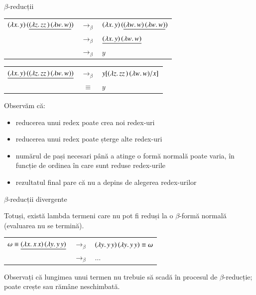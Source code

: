 \documentclass[xcolor=pdftex,romanian,colorlinks]{beamer}
\begin{document}
\begin{frame}[fragile]{$\beta$-reducții}

\begin{center}
\begin{tabular}{rcl}
$(\lambda x.\,y)\, (\underline{(\lambda z.\,zz\, )\, (\lambda w.\,w)})$ & $\rightarrow_\beta$ &  $(\lambda x.\,y)\, (\underline{(\lambda w.\,w)\, (\lambda w.\,w)})$ \\
& $\rightarrow_\beta$ & $\underline{(\lambda x.\,y)\, (\lambda w.\,w)}$ \\
& $\rightarrow_\beta$ & $y$ \\
\end{tabular}
\end{center}

\begin{center}
\begin{tabular}{rcl}
$\underline{(\lambda x.\,y)\, ((\lambda z.\,zz\, )\, (\lambda w.\,w))}$ & $\rightarrow_\beta$ & $y[(\lambda z.\,zz\, )\, (\lambda w.\,w)/x]$ \\ 
& $\equiv$ & $y$ \\
\end{tabular}
\end{center}

Observăm că:
\begin{itemize}
	\item reducerea unui redex poate crea noi redex-uri
	\item reducerea unui redex poate șterge alte redex-uri
	\item numărul de pași necesari până a atinge o formă normală poate varia, în funcție de ordinea în care sunt reduse redex-urile
	\item rezultatul final pare că nu a depins de alegerea redex-urilor 
\end{itemize}

\end{frame}


\begin{frame}[fragile]{$\beta$-reducții divergente}

Totuși, există lambda termeni care nu pot fi reduși la o $\beta$-formă normală (evaluarea nu se termină).

\begin{center}
\begin{tabular}{rcl}
$\omega \equiv \underline{(\lambda x.\,x\, x)\, (\lambda y.\,y\, y)}$ & $\rightarrow_\beta$ & $(\lambda y.\,y\, y)\, (\lambda y.\,y\, y) \equiv \omega$ \\
& $\rightarrow_\beta$ & $\ldots$ \\
\end{tabular}
\end{center}

Observați că lungimea unui termen nu trebuie să scadă în procesul de $\beta$-reducție; poate crește sau rămâne neschimbată.
\end{frame}
\end{document}
